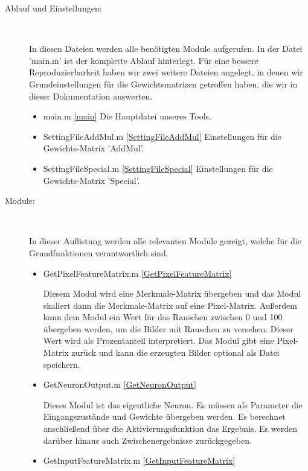 \begin{description}
	\item[Ablauf und Einstellungen:]~\par
	
	In diesen Dateien werden alle benötigten Module aufgerufen. In der Datei 'main.m' ist der komplette Ablauf hinterlegt. Für eine bessere Reproduzierbarkeit haben wir zwei weitere Dateien angelegt, in denen wir Grundeinstellungen für die Gewichtsmatrizen getroffen haben, die wir in dieser Dokumentation auswerten.
	
	\begin{itemize}
		\item main.m \ref{main}  Die Hauptdatei unseres Tools. 
		\item SettingFileAddMul.m \ref{SettingFileAddMul}  Einstellungen für die Gewichts-Matrix 'AddMul'.		
		\item SettingFileSpecial.m \ref{SettingFileSpecial} Einstellungen für die Gewichts-Matrix 'Special'.
		
	\end{itemize}
	
	\item[Module:]~\par
	
	In dieser Auflistung werden alle relevanten Module gezeigt, welche für die Grundfunktionen verantwortlich sind.
	
	\begin{itemize}
		\item GetPixelFeatureMatrix.m \ref{GetPixelFeatureMatrix}  
		
		Diesem Modul wird eine Merkmale-Matrix übergeben und das Modul skaliert dann die Merkmale-Matrix auf eine Pixel-Matrix. Außerdem kann dem Modul ein Wert für das Rauschen zwischen 0 und 100 übergeben werden, um die Bilder mit Rauschen zu versehen. Dieser Wert wird als Prozentanteil interpretiert. Das Modul gibt eine Pixel-Matrix zurück und kann die erzeugten Bilder optional als Datei speichern. 
		
		\item GetNeuronOutput.m \ref{GetNeuronOutput}  
		
		Dieses Modul ist das eigentliche Neuron. Es müssen als Parameter die Eingangszustände und Gewichte übergeben werden. Es berechnet anschließend über die Aktivierungsfunktion das Ergebnis. Es werden darüber hinaus auch Zwischenergebnisse zurückgegeben. 
		
		\item GetInputFeatureMatrix.m \ref{GetInputFeatureMatrix}  
		

\end{itemize}
\end{description}
